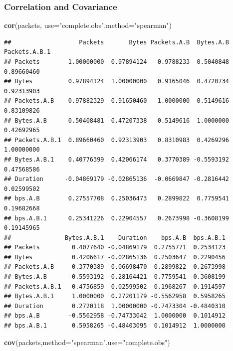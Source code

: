 \documentclass[]{article}
\newenvironment{Shaded}{\begin{snugshade}}{\end{snugshade}}
\newcommand{\KeywordTok}[1]{\textcolor[rgb]{0.13,0.29,0.53}{\textbf{{#1}}}}
\newcommand{\DataTypeTok}[1]{\textcolor[rgb]{0.13,0.29,0.53}{{#1}}}
\newcommand{\StringTok}[1]{\textcolor[rgb]{0.31,0.60,0.02}{{#1}}}
\newcommand{\NormalTok}[1]{{#1}}
\begin{document}
\subsubsection{Correlation and
Covariance}\label{correlation-and-covariance}

\begin{Shaded}
\begin{Highlighting}[]
\KeywordTok{cor}\NormalTok{(packets, }\DataTypeTok{use=}\StringTok{"complete.obs"}\NormalTok{,}\DataTypeTok{method=}\StringTok{"spearman"}\NormalTok{)}
\end{Highlighting}
\end{Shaded}

\begin{verbatim}
##                   Packets       Bytes Packets.A.B  Bytes.A.B Packets.A.B.1
## Packets        1.00000000  0.97894124   0.9788233  0.5040848    0.89660460
## Bytes          0.97894124  1.00000000   0.9165046  0.4720734    0.92313903
## Packets.A.B    0.97882329  0.91650460   1.0000000  0.5149616    0.83109826
## Bytes.A.B      0.50408481  0.47207338   0.5149616  1.0000000    0.42692965
## Packets.A.B.1  0.89660460  0.92313903   0.8310983  0.4269296    1.00000000
## Bytes.A.B.1    0.40776399  0.42066174   0.3770389 -0.5593192    0.47568586
## Duration      -0.04869179 -0.02865136  -0.0669847 -0.2816442    0.02599502
## bps.A.B        0.27557708  0.25036473   0.2899822  0.7759541    0.19682668
## bps.A.B.1      0.25341226  0.22904557   0.2673998 -0.3608199    0.19145965
##               Bytes.A.B.1    Duration    bps.A.B  bps.A.B.1
## Packets         0.4077640 -0.04869179  0.2755771  0.2534123
## Bytes           0.4206617 -0.02865136  0.2503647  0.2290456
## Packets.A.B     0.3770389 -0.06698470  0.2899822  0.2673998
## Bytes.A.B      -0.5593192 -0.28164421  0.7759541 -0.3608199
## Packets.A.B.1   0.4756859  0.02599502  0.1968267  0.1914597
## Bytes.A.B.1     1.0000000  0.27201179 -0.5562958  0.5958265
## Duration        0.2720118  1.00000000 -0.7473304 -0.4840310
## bps.A.B        -0.5562958 -0.74733042  1.0000000  0.1014912
## bps.A.B.1       0.5958265 -0.48403095  0.1014912  1.0000000
\end{verbatim}

\begin{Shaded}
\begin{Highlighting}[]
\KeywordTok{cov}\NormalTok{(packets,}\DataTypeTok{method=}\StringTok{"spearman"}\NormalTok{,}\DataTypeTok{use=}\StringTok{"complete.obs"}\NormalTok{)}
\end{Highlighting}
\end{Shaded}
\end{document}

